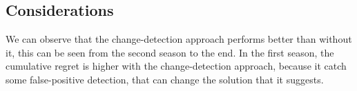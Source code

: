 \subsection*{Considerations}
We can observe that the change-detection approach performs better than without it, this can be seen from the second season to the end. In the first season, the cumulative regret is higher with the change-detection approach, because it catch some false-positive detection, that can change the solution that it suggests.